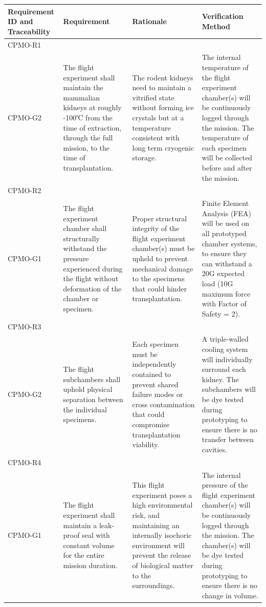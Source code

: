 \documentclass[conf]{new-aiaa}
\begin{document}
\begin{table}[H]
    \centering
    \footnotesize
    \setlength{\tabcolsep}{4pt}
    \renewcommand{\arraystretch}{1.15}
    \begin{tabularx}{\textwidth}{@{}>{\raggedright\arraybackslash}m{2.4cm}YYY@{}}
    \toprule
    \textbf{Requirement ID and Traceability} & \textbf{Requirement} & \textbf{Rationale} & \textbf{Verification Method} \\
    \midrule
    CPMO-R1\\CPMO-G2 &
    The flight experiment shall maintain the mammalian kidneys at roughly -100℃ from the time of extraction, through the full mission, to the time of transplantation. &
    The rodent kidneys need to maintain a vitrified state without forming ice crystals but at a temperature consistent with long term cryogenic storage. &
    The internal temperature of the flight experiment chamber(s) will be continuously logged through the mission. The temperature of each specimen will be collected before and after the mission. \\ \hline

    CPMO-R2\\CPMO-G1 &
    The flight experiment chamber shall structurally withstand the pressure experienced during the flight without deformation of the chamber or specimen. &
    Proper structural integrity of the flight experiment chamber(s) must be upheld to prevent mechanical damage to the specimens that could hinder transplantation. &
    Finite Element Analysis (FEA) will be used on all prototyped chamber systems, to ensure they can withstand a 20G expected load (10G maximum force with Factor of Safety = 2). \\ \hline

    CPMO-R3\\CPMO-G2 &
    The flight subchambers shall uphold physical separation between the individual specimens. &
    Each specimen must be independently contained to prevent shared failure modes or cross contamination that could compromise transplantation viability. &
    A triple-walled cooling system will individually surround each kidney. The subchambers will be dye tested during prototyping to ensure there is no transfer between cavities. \\ \hline

    CPMO-R4\\CPMO-G1 &
    The flight experiment shall maintain a leak-proof seal with constant volume for the entire mission duration. &
    This flight experiment poses a high environmental risk, and maintaining an internally isochoric environment will prevent the release of biological matter to the surroundings. &
    The internal pressure of the flight experiment chamber(s) will be continuously logged through the mission. The chamber(s) will be dye tested during prototyping to ensure there is no change in volume. \\ \hline


\end{tabularx}
\end{table}
\end{document}
